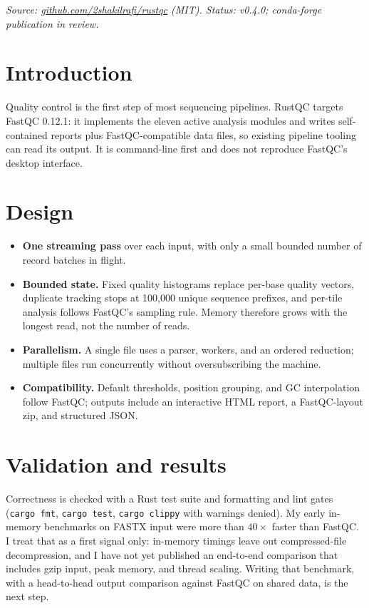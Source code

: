 

\textit{Source: \href{https://github.com/2shakilrafi/rustqc}{github.com/2shakilrafi/rustqc} (MIT). Status: v0.4.0; conda-forge publication in review.}


\section{Introduction}
Quality control is the first step of most sequencing pipelines. RustQC targets FastQC 0.12.1: it implements the eleven active analysis modules and writes self-contained reports plus FastQC-compatible data files, so existing pipeline tooling can read its output. It is command-line first and does not reproduce FastQC's desktop interface.

\section{Design}
\begin{itemize}
\item \textbf{One streaming pass} over each input, with only a small bounded number of record batches in flight.
\item \textbf{Bounded state.} Fixed quality histograms replace per-base quality vectors, duplicate tracking stops at 100{,}000 unique sequence prefixes, and per-tile analysis follows FastQC's sampling rule. Memory therefore grows with the longest read, not the number of reads.
\item \textbf{Parallelism.} A single file uses a parser, workers, and an ordered reduction; multiple files run concurrently without oversubscribing the machine.
\item \textbf{Compatibility.} Default thresholds, position grouping, and GC interpolation follow FastQC; outputs include an interactive HTML report, a FastQC-layout zip, and structured JSON.
\end{itemize}

\section{Validation and results}
Correctness is checked with a Rust test suite and formatting and lint gates (\texttt{cargo fmt}, \texttt{cargo test}, \texttt{cargo clippy} with warnings denied). My early in-memory benchmarks on FASTX input were more than $40\times$ faster than FastQC. I treat that as a first signal only: in-memory timings leave out compressed-file decompression, and I have not yet published an end-to-end comparison that includes gzip input, peak memory, and thread scaling. Writing that benchmark, with a head-to-head output comparison against FastQC on shared data, is the next step.

